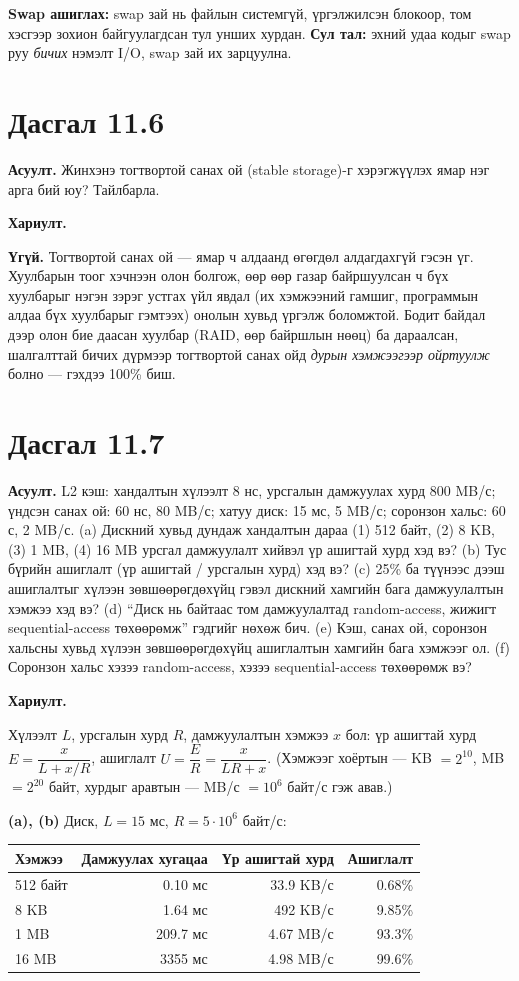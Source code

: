 \documentclass[12pt,a4paper]{article}
\newcommand{\question}[2]{\section{Дасгал #1}\textbf{Асуулт.} #2\par\medskip\textbf{Хариулт.}\par}
\begin{document}
\textbf{Swap ашиглах:} swap зай нь файлын системгүй, үргэлжилсэн блокоор, том хэсгээр зохион байгуулагдсан тул унших хурдан. \textbf{Сул тал:} эхний удаа кодыг swap руу \emph{бичих} нэмэлт I/O, swap зай их зарцуулна.

\question{11.6}{Жинхэнэ тогтвортой санах ой (stable storage)-г хэрэгжүүлэх ямар нэг арга бий юу? Тайлбарла.}

\textbf{Үгүй.} Тогтвортой санах ой — ямар ч алдаанд өгөгдөл алдагдахгүй гэсэн үг. Хуулбарын тоог хэчнээн олон болгож, өөр өөр газар байршуулсан ч бүх хуулбарыг нэгэн зэрэг устгах үйл явдал (их хэмжээний гамшиг, программын алдаа бүх хуулбарыг гэмтээх) онолын хувьд үргэлж боломжтой. Бодит байдал дээр олон бие даасан хуулбар (RAID, өөр байршлын нөөц) ба дараалсан, шалгалттай бичих дүрмээр тогтвортой санах ойд \emph{дурын хэмжээгээр ойртуулж} болно — гэхдээ 100\% биш.

\question{11.7}{L2 кэш: хандалтын хүлээлт 8 нс, урсгалын дамжуулах хурд 800 MB/с; үндсэн санах ой: 60 нс, 80 MB/с; хатуу диск: 15 мс, 5 MB/с; соронзон хальс: 60 с, 2 MB/с. (a) Дискний хувьд дундаж хандалтын дараа (1) 512 байт, (2) 8 KB, (3) 1 MB, (4) 16 MB урсгал дамжуулалт хийвэл үр ашигтай хурд хэд вэ? (b) Тус бүрийн ашиглалт (үр ашигтай / урсгалын хурд) хэд вэ? (c) 25\% ба түүнээс дээш ашиглалтыг хүлээн зөвшөөрөгдөхүйц гэвэл дискний хамгийн бага дамжуулалтын хэмжээ хэд вэ? (d) “Диск нь \underline{\quad} байтаас том дамжуулалтад random-access, жижигт sequential-access төхөөрөмж” гэдгийг нөхөж бич. (e) Кэш, санах ой, соронзон хальсны хувьд хүлээн зөвшөөрөгдөхүйц ашиглалтын хамгийн бага хэмжээг ол. (f) Соронзон хальс хэзээ random-access, хэзээ sequential-access төхөөрөмж вэ?}

Хүлээлт $L$, урсгалын хурд $R$, дамжуулалтын хэмжээ $x$ бол: үр ашигтай хурд $E = \dfrac{x}{L + x/R}$, ашиглалт $U = \dfrac{E}{R} = \dfrac{x}{LR + x}$. (Хэмжээг хоёртын — KB $= 2^{10}$, MB $= 2^{20}$ байт, хурдыг аравтын — MB/с $= 10^6$ байт/с гэж авав.)

\textbf{(a), (b)} Диск, $L = 15$ мс, $R = 5 \cdot 10^6$ байт/с:
\begin{center}
\begin{tabular}{lrrr}
\toprule
Хэмжээ & Дамжуулах хугацаа & Үр ашигтай хурд & Ашиглалт\\
\midrule
512 байт & 0.10 мс & 33.9 KB/с & 0.68\%\\
8 KB & 1.64 мс & 492 KB/с & 9.85\%\\
1 MB & 209.7 мс & 4.67 MB/с & 93.3\%\\
16 MB & 3355 мс & 4.98 MB/с & 99.6\%\\
\bottomrule
\end{tabular}
\end{center}
\end{document}
